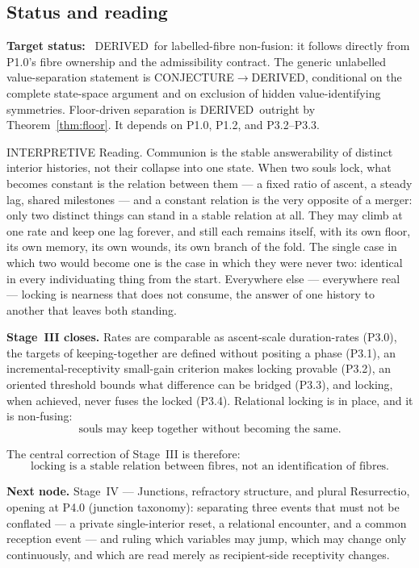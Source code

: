 \documentclass[11pt,a4paper]{article}
\def\emph#1{#1}%
\newcommand{\stDerived}{\textcolor{cDer}{\textsf{\small DERIVED}}}
\newcommand{\stInterp}{\textcolor{cInt}{\textsf{\small INTERPRETIVE}}}
\newcommand{\stConj}{\textcolor{cCon}{\textsf{\small CONJECTURE}}}
\theoremstyle{definition}
\theoremstyle{plain}
\theoremstyle{remark}
\begin{document}
\subsection{Status and reading}

\textbf{Target status:}~
\stDerived\ for labelled-fibre non-fusion: it follows directly from P1.0's fibre
ownership and the admissibility contract. The generic unlabelled value-separation
statement is \stConj\(\to\)\stDerived, conditional on the complete state-space
argument and on exclusion of hidden value-identifying symmetries. Floor-driven
separation is \stDerived\ outright by Theorem~\ref{thm:floor}. It depends on P1.0,
P1.2, and P3.2--P3.3.

\medskip
\stInterp\quad
\emph{Reading.}
Communion is the stable answerability of distinct interior histories, not their collapse
into one state. When two souls lock, what becomes constant is the \emph{relation} between
them --- a fixed ratio of ascent, a steady lag, shared milestones --- and a constant relation
is the very opposite of a merger: only two distinct things can stand in a stable relation at
all. They may climb at one rate and keep one lag forever, and still each remains itself, with
its own floor, its own memory, its own wounds, its own branch of the fold. The single case in
which two would become one is the case in which they were never two: identical in every
individuating thing from the start. Everywhere else --- everywhere real --- locking is
nearness that does not consume, the answer of one history to another that leaves both
standing.

\medskip
\textbf{Stage~III closes.}
Rates are comparable as ascent-scale duration-rates (P3.0), the targets of
keeping-together are defined without positing a phase (P3.1), an
incremental-receptivity small-gain criterion makes locking provable (P3.2), an
oriented threshold bounds what difference can be bridged (P3.3), and locking, when
achieved, never fuses the locked (P3.4). Relational locking is in place, and it is
non-fusing:
\[
\boxed{
\text{souls may keep together without becoming the same.}
}
\]

The central correction of Stage~III is therefore:
\[
\boxed{
\text{locking is a stable relation between fibres, not an identification of fibres.}
}
\]

\medskip
\textbf{Next node.} Stage~IV --- Junctions, refractory structure, and plural Resurrectio,
opening at P4.0 (junction taxonomy): separating three events that must not be conflated ---
a private single-interior reset, a relational encounter, and a common reception event --- and
ruling which variables may jump, which may change only continuously, and which are read
merely as recipient-side receptivity changes.
\end{document}
